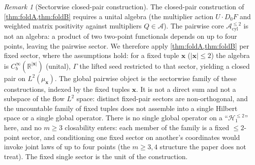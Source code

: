 \documentclass[reqno,final,11pt]{amsart}
\theoremstyle{plain}
\theoremstyle{definition}
\theoremstyle{remark}
\newtheorem{remark}[theorem]{Remark}
\newcommand{\R}{\mathbb R}
\newcommand{\cA}{\mathcal A}
\newcommand{\Hone}{\mathcal H_{1}}
\newcommand{\Apair}{\cA^{\le 2}_{\mathrm{cyl}}}
\begin{document}
\begin{remark}[Sectorwise closed-pair construction]\label{rem:sectorwise}
The closed-pair construction of \cref{thm:foldA,thm:foldB} requires a unital
algebra (the multiplier action $U\!\cdot\!D_0F$ and weighted matrix positivity
against multipliers $Q\in\cA$). The pairwise core $\Apair$ is not an
algebra: a product of two two-point functionals depends on up to four points,
leaving the pairwise sector. We therefore apply \cref{thm:foldA,thm:foldB}
per fixed sector, where the assumptions hold: for a fixed tuple
$\mathbf x$ ($|\mathbf x|\le2$) the algebra is $C_b^\infty(\R^{|\mathbf x|})$
(unital), $\Gamma$ the lifted seed restricted to that sector, yielding a
closed pair on $L^2(\mu_{\mathbf x})$. The global pairwise object is the
sectorwise family of these constructions, indexed by the fixed tuples
$\mathbf x$. It is not a direct sum and not a subspace of the flow
$L^2$ space: distinct fixed-pair sectors are non-orthogonal, and the uncountable
family of fixed tuples does not assemble into a single Hilbert space or a single
global operator. There is no single global operator on a ``$\Hone^{\le2}$'' here, and no $m\ge3$ closability enters: each member of the family is a fixed $\le2$-point sector, and
conditioning one fixed sector on another's coordinates would invoke joint laws of
up to four points (the $m\ge3,4$ structure the paper does not treat). The fixed
single sector is the unit of the construction.
\end{remark}
\end{document}
